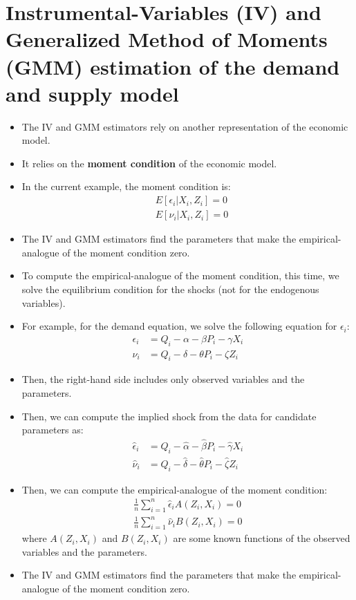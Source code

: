 \documentclass[
]{book}
\providecommand{\tightlist}{%
  \setlength{\itemsep}{0pt}\setlength{\parskip}{0pt}}
\begin{document}
\hypertarget{instrumental-variables-iv-and-generalized-method-of-moments-gmm-estimation-of-the-demand-and-supply-model}{%
\section{Instrumental-Variables (IV) and Generalized Method of Moments (GMM) estimation of the demand and supply model}\label{instrumental-variables-iv-and-generalized-method-of-moments-gmm-estimation-of-the-demand-and-supply-model}}

\begin{itemize}
\tightlist
\item
  The IV and GMM estimators rely on another representation of the economic model.
\item
  It relies on the \textbf{moment condition} of the economic model.
\item
  In the current example, the moment condition is:
  \begin{align}
    & E[\epsilon_i | X_i, Z_i] = 0\\
    & E[\nu_i | X_i, Z_i] = 0
  \end{align}
\item
  The IV and GMM estimators find the parameters that make the empirical-analogue of the moment condition zero.
\item
  To compute the empirical-analogue of the moment condition, this time, we solve the equilibrium condition for the shocks (not for the endogenous variables).
\item
  For example, for the demand equation, we solve the following equation for \(\epsilon_i\):
  \begin{align}
    \epsilon_i &= Q_i - \alpha - \beta P_i - \gamma X_i\\
    \nu_i &= Q_i - \delta - \theta P_i - \zeta Z_i
  \end{align}
\item
  Then, the right-hand side includes only observed variables and the parameters.
\item
  Then, we can compute the implied shock from the data for candidate parameters as:
  \begin{align}
    \hat{\epsilon}_i &= Q_i - \hat{\alpha} - \hat{\beta} P_i - \hat{\gamma} X_i\\
    \hat{\nu}_i &= Q_i - \hat{\delta} - \hat{\theta} P_i - \hat{\zeta} Z_i
  \end{align}
\item
  Then, we can compute the empirical-analogue of the moment condition:
  \begin{align}
    \frac{1}{n} \sum_{i=1}^n \hat{\epsilon}_i A(Z_i, X_i) = 0\\
    \frac{1}{n} \sum_{i=1}^n \hat{\nu}_i B(Z_i, X_i) = 0
  \end{align}
  where \(A(Z_i, X_i)\) and \(B(Z_i, X_i)\) are some known functions of the observed variables and the parameters.
\item
  The IV and GMM estimators find the parameters that make the empirical-analogue of the moment condition zero.
\end{itemize}
\end{document}
